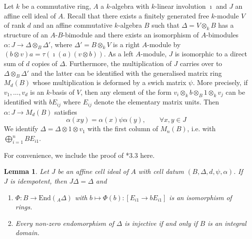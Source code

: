 \documentclass[oneside, a4paper, 11pt]{amsart}
\newtheorem{lemma}[theorem]{Lemma}
\begin{document}
Let $k$ be a commutative ring, $A$ a $k$-algebra with $k$-linear involution $\imath$ and $J$ an affine cell ideal of $A$. Recall that there exists a finitely generated free $k$-module $V$ of rank $d$ and an affine commutative $k$-algebra  $B$ such that $\Delta=V\otimes_k B$ has a structure of an $A$-$B$-bimodule and there exists an isomorphism of 
$A$-bimodules $\alpha:J\rightarrow \Delta \otimes_B \Delta'$, where $\Delta' = B\otimes_k V$ is a right $A$-module by 
$(b\otimes v)a = \tau\left(\imath(a)(v\otimes b)\right)$.
As a left $A$-module, $J$ is isomorphic to a direct sum of $d$ copies of $\Delta$. Furthermore, the multiplication of $J$ carries over to $\Delta \otimes_B \Delta'$ and the latter can be identified with the generalised 
matrix ring $M_d(B)$ whose multiplication is deformed by a swich matrix $\psi$. More precisely, if $v_1, \ldots, v_d$ is an 
$k$-basis of $V$, then any element of the form 
$v_i\otimes_k b \otimes_B 1\otimes_k v_j$ can be identified with $bE_{ij}$ where $E_{ij}$ denote the elementary matrix 
units. Then $\alpha:J\rightarrow M_d(B)$ satisfies
\begin{equation}\label{eq2} \alpha(xy)=\alpha(x)\psi\alpha(y), \qquad \forall x,y \in J\end{equation}
We identify $\Delta = \Delta \otimes 1 \otimes v_1$ with the first column of $M_n(B)$, i.e. with $\bigoplus_{i=1}^n BE_{i1}$.


For convenience, we include the proof of \cite{CKLS}*{3.3} here. 

\begin{lemma}\label{lemma12} Let $J$ be an affine cell ideal of $A$ with cell datum $(B, \Delta,  d, \psi, \alpha)$. If $J$ is idempotent, then 
$J\Delta=\Delta$ and
\begin{enumerate}
    \item $\Phi:B\to \mathrm{End}({_A\Delta})$ with $b\mapsto \Phi(b):[E_{i1}\to bE_{i1}]$ is an isomorphism of rings.
    \item Every non-zero endomorphism of $\Delta$ is injective if and only if $B$ is an integral domain.
\end{enumerate}
\end{lemma}
\end{document}
